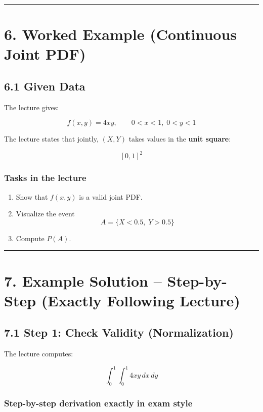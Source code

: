 \documentclass[12pt]{article}
\begin{document}
\hrule
\vspace{1em}

\section*{6. Worked Example (Continuous Joint PDF)}

\subsection*{6.1 Given Data}

The lecture gives:

\[
f(x,y)=4xy,\qquad 0<x<1,\;0<y<1
\]

The lecture states that jointly, \((X,Y)\) takes values in the \textbf{unit square}:

\[
[0,1]^2
\]

\subsubsection*{Tasks in the lecture}

\begin{enumerate}
    \item Show that \(f(x,y)\) is a valid joint PDF.
    \item Visualize the event
    \[
    A=\{X<0.5,\;Y>0.5\}
    \]
    \item Compute \(P(A)\).
\end{enumerate}

\hrule
\vspace{1em}

\section*{7. Example Solution – Step-by-Step (Exactly Following Lecture)}

\subsection*{7.1 Step 1: Check Validity (Normalization)}

The lecture computes:

\[
\int_0^1 \int_0^1 4xy\,dx\,dy
\]

\subsubsection*{Step-by-step derivation exactly in exam style}
\end{document}
